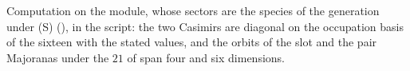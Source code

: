 Computation on the module, whose sectors are the species of the generation under (S) (), in the script: the two Casimirs are diagonal on the occupation basis of the sixteen with the stated values, and the orbits of the slot and the pair Majoranas under the $21$ of  span four and six dimensions.
